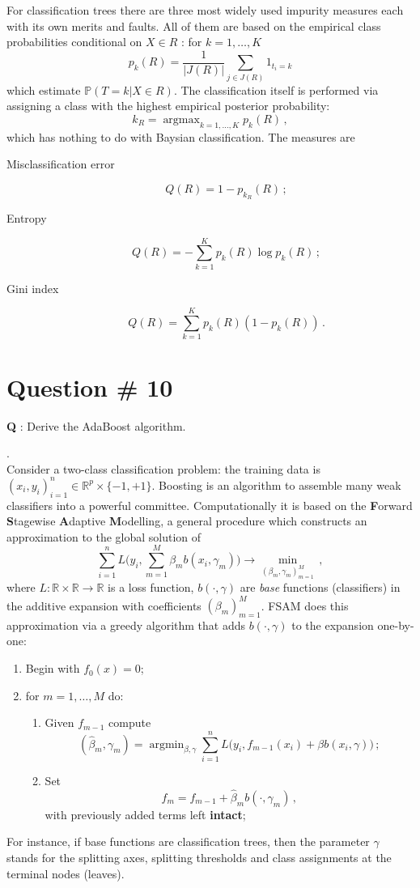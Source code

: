\documentclass[a4paper]{article}
\newcommand{\Real}{\mathbb{R}}
\newcommand{\pr}{\mathbb{P}}
\newcommand{\argmin}{\mathop{\text{argmin}}}
\newcommand{\argmax}{\mathop{\text{argmax}}}
\begin{document}
For classification trees there are three most widely used impurity measures each
with its own merits and faults. All of them are based on the empirical class
probabilities conditional on $X\in R$ : for $k = 1,\ldots, K$
\[ p_k(R) = \frac{1}{|J(R)|} \sum_{j\in J(R)} 1_{t_i = k}\]
which estimate $\pr(T=k|X\in R)$. The classification itself is performed via assigning
a class with the highest empirical posterior probability:
\[ k_R = \argmax_{k=1,\ldots, K} p_k(R)\,, \]
which has nothing to do with Baysian classification. The measures are \begin{description}
	\item[Misclassification error] \[ Q(R) = 1 - p_{k_R}(R)\,; \]
	\item[Entropy] \[ Q(R) = - \sum_{k=1}^K p_k(R) \log p_k(R) \,; \]
	\item[Gini index] \[ Q(R) = \sum_{k=1}^K p_k(R) ( 1 - p_k(R)) \,. \]
\end{description}


\clearpage

\section[AdaBoost]{Question \# 10} %
\label{sec:question_10}
\textbf{\large \textbf{Q}} : Derive the AdaBoost algorithm.

 .\hfill\\
Consider a two-class classification problem: the training data is $(x_i, y_i)_{i=1}^n
\in \Real^p \times \{-1,+1\}$. Boosting is an algorithm to assemble many weak classifiers
into a powerful committee. Computationally it is based on the \textbf{F}orward
\textbf{S}tagewise \textbf{A}daptive \textbf{M}odelling, a general procedure which
constructs an approximation to the global solution of
\[
\sum_{i=1}^n L\bigl( y_i, \sum_{m=1}^M \beta_m b(x_i,\gamma_m) \bigr)
	\to \min_{(\beta_m,\gamma_m)_{m=1}^M}\,,
\]
where $ L:\Real\times \Real\to \Real$ is a loss function, $b(\cdot,\gamma)$ are
\emph{base} functions (classifiers) in the additive expansion with coefficients
$(\beta_m)_{m=1}^M$. FSAM does this approximation via a greedy algorithm that adds
$b(\cdot,\gamma)$ to the expansion one-by-one: \begin{enumerate}
	\item Begin with $f_0(x) = 0$;
	\item for $m=1,\ldots, M$ do: \begin{enumerate}
		\item Given $f_{m-1}$ compute 
		\[
			( \hat{\beta}_m, \gamma_m)
			= \argmin_{\beta,\gamma} \sum_{i=1}^n
				L\bigl( y_i, f_{m-1}(x_i) + \beta b(x_i,\gamma) \bigr)\,;
		\]
		\item Set
		\[ f_m = f_{m-1} + \hat{\beta}_m b(\cdot,\gamma_m)\,, \]
		with previously added terms left \textbf{intact};
	\end{enumerate}
\end{enumerate}
For instance, if base functions are classification trees, then the parameter $\gamma$
stands for the splitting axes, splitting thresholds and class assignments at the
terminal nodes (leaves).
\end{document}
